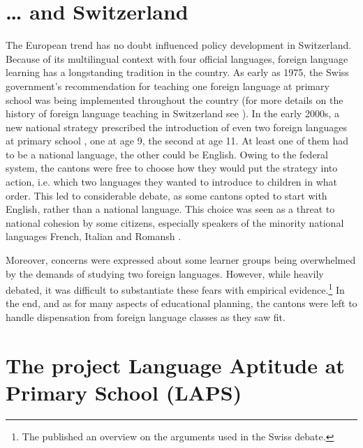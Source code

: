 \documentclass[output=paper]{langsci/langscibook}
\begin{document}
\section{… and Switzerland}

The European trend has no doubt influenced policy development in Switzerland. Because of its multilingual context with four official languages, foreign language learning has a longstanding tradition in the country. As early as 1975, the Swiss government’s recommendation for teaching one foreign language at primary school was being implemented throughout the country (for more details on the history of foreign language teaching in Switzerland see \citealt{GiudiciGrizelj2016}). In the early 2000s, a new national strategy prescribed the introduction of even two foreign languages at primary school \citep{EDK2004}, one at age 9, the second at age 11. At least one of them had to be a national language, the other could be English. Owing to the federal system, the cantons were free to choose how they would put the strategy into action, i.e. which two languages they wanted to introduce to children in what order. This led to considerable debate, as some cantons opted to start with English, rather than a national language. This choice was seen as a threat to national cohesion by some citizens, especially speakers of the minority national languages French, Italian and Romansh \citep{Stotz2006}.

Moreover, concerns were expressed about some learner groups being overwhelmed by the demands of studying two foreign languages. However, while heavily debated, it was difficult to substantiate these fears with empirical evidence.\footnote{The \citet{SchweizerischeAkademiederGeisteswissenschaften2015} published an overview on the arguments used in the Swiss debate.} In the end, and as for many aspects of educational planning, the cantons were left to handle dispensation from foreign language classes as they saw fit.

\section{The project Language Aptitude at Primary School (LAPS)}\largerpage
\end{document}
